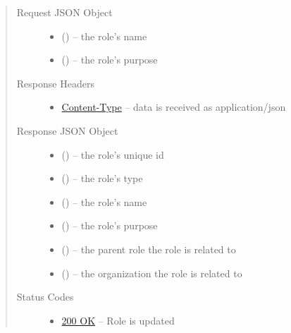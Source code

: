 \documentclass[letterpaper,10pt,english]{sphinxmanual}
\begin{document}
\begin{fulllineitems}
\begin{quote}
\begin{description}
\begin{itemize}
\end{itemize}

\item[{Request JSON Object}] \leavevmode\begin{itemize}
\item {} 
 () -- the role's name

\item {} 
 () -- the role's purpose

\end{itemize}

\item[{Response Headers}] \leavevmode\begin{itemize}
\item {} 
\href{http://tools.ietf.org/html/rfc7231\#section-3.1.1.5}{Content-Type} -- data is received as application/json

\end{itemize}

\item[{Response JSON Object}] \leavevmode\begin{itemize}
\item {} 
 () -- the role's unique id

\item {} 
 () -- the role's type

\item {} 
 () -- the role's name

\item {} 
 () -- the role's purpose

\item {} 
 () -- the parent role the role is related to

\item {} 
 () -- the organization the role is related to

\end{itemize}

\item[{Status Codes}] \leavevmode\begin{itemize}
\item {} 
\href{http://www.w3.org/Protocols/rfc2616/rfc2616-sec10.html\#sec10.2.1}{200 OK} -- Role is updated


\end{itemize}
\end{description}
\end{quote}
\end{fulllineitems}
\end{document}
